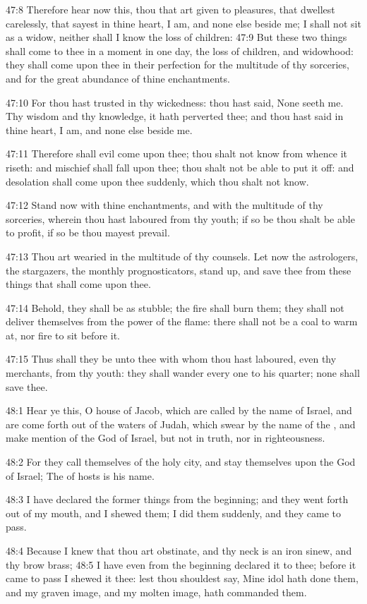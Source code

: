 47:8 Therefore hear now this, thou that art given to pleasures, that dwellest carelessly, that sayest in thine heart, I am, and none else beside me; I shall not sit as a widow, neither shall I know the loss of children: 47:9 But these two things shall come to thee in a moment in one day, the loss of children, and widowhood: they shall come upon thee in their perfection for the multitude of thy sorceries, and for the great abundance of thine enchantments.

47:10 For thou hast trusted in thy wickedness: thou hast said, None seeth me. Thy wisdom and thy knowledge, it hath perverted thee; and thou hast said in thine heart, I am, and none else beside me.

47:11 Therefore shall evil come upon thee; thou shalt not know from whence it riseth: and mischief shall fall upon thee; thou shalt not be able to put it off: and desolation shall come upon thee suddenly, which thou shalt not know.

47:12 Stand now with thine enchantments, and with the multitude of thy sorceries, wherein thou hast laboured from thy youth; if so be thou shalt be able to profit, if so be thou mayest prevail.

47:13 Thou art wearied in the multitude of thy counsels. Let now the astrologers, the stargazers, the monthly prognosticators, stand up, and save thee from these things that shall come upon thee.

47:14 Behold, they shall be as stubble; the fire shall burn them; they shall not deliver themselves from the power of the flame: there shall not be a coal to warm at, nor fire to sit before it.

47:15 Thus shall they be unto thee with whom thou hast laboured, even thy merchants, from thy youth: they shall wander every one to his quarter; none shall save thee.

48:1 Hear ye this, O house of Jacob, which are called by the name of Israel, and are come forth out of the waters of Judah, which swear by the name of the \LORD, and make mention of the God of Israel, but not in truth, nor in righteousness.

48:2 For they call themselves of the holy city, and stay themselves upon the God of Israel; The \LORD of hosts is his name.

48:3 I have declared the former things from the beginning; and they went forth out of my mouth, and I shewed them; I did them suddenly, and they came to pass.

48:4 Because I knew that thou art obstinate, and thy neck is an iron sinew, and thy brow brass; 48:5 I have even from the beginning declared it to thee; before it came to pass I shewed it thee: lest thou shouldest say, Mine idol hath done them, and my graven image, and my molten image, hath commanded them.

